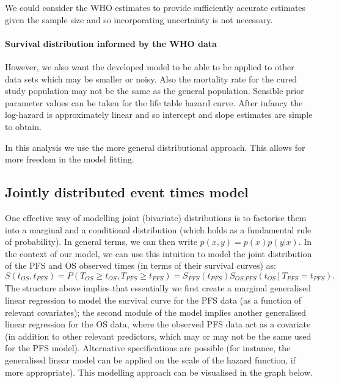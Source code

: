\documentclass[
]{article}
\begin{document}
We could consider the WHO estimates to provide sufficiently accurate
estimates given the sample size and so incorporating uncertainty is not
necessary.

\hypertarget{survival-distribution-informed-by-the-who-data}{%
\paragraph{Survival distribution informed by the WHO
data}\label{survival-distribution-informed-by-the-who-data}}

However, we also want the developed model to be able to be applied to
other data sets which may be smaller or noisy. Also the mortality rate
for the cured study population may not be the same as the general
population. Sensible prior parameter values can be taken for the life
table hazard curve. After infancy the log-hazard is approximately linear
and so intercept and slope estimates are simple to obtain.

In this analysis we use the more general distributional approach. This
allows for more freedom in the model fitting.

\hypertarget{jointly-distributed-event-times-model}{%
\subsection{Jointly distributed event times
model}\label{jointly-distributed-event-times-model}}

One effective way of modelling joint (bivariate) distributions is to
factorise them into a marginal and a conditional distribution (which
holds as a fundamental rule of probability). In general terms, we can
then write \(p(x,y) = p(x)p(y | x)\). In the context of our model, we
can use this intuition to model the joint distribution of the PFS and OS
observed times (in terms of their survival curves) as: \[
S(t_{OS},t_{PFS}) = P⁡(T_{OS} \geq t_{OS}, T_{PFS} \geq t_{PFS})
= S_{PFS} (t_{PFS}) S_{OS|PFS}(t_{OS}│T_{PFS} = t_{PFS}).
\] The structure above implies that essentially we first create a
marginal generalised linear regression to model the survival curve for
the PFS data (as a function of relevant covariates); the second module
of the model implies another generalised linear regression for the OS
data, where the observed PFS data act as a covariate (in addition to
other relevant predictors, which may or may not be the same used for the
PFS model). Alternative specifications are possible (for instance, the
generalised linear model can be applied on the scale of the hazard
function, if more appropriate). This modelling approach can be
visualised in the graph below.
\end{document}
